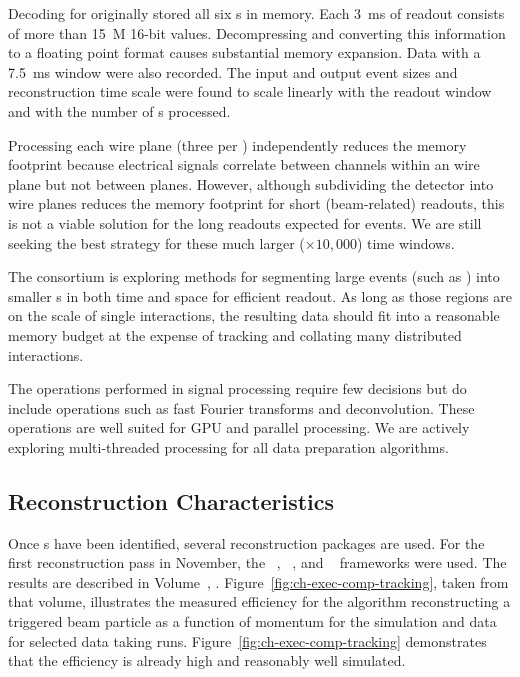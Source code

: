 Decoding for  originally stored all six s in memory. Each \SI{3}{ms} of  readout consists of more than \SI{15}{M} 16-bit values. Decompressing and converting this information to a floating point format causes substantial memory expansion. 
  Data with a \SI{7.5}{ms} window were also recorded. 
The input and output event sizes and reconstruction time scale were found to scale linearly with the readout window and with the number of s processed. 

Processing each wire plane (three per ) independently reduces the memory footprint because electrical signals correlate between channels within an  wire plane but not between planes.
However,  although subdividing the detector into wire planes reduces the memory footprint for short (beam-related) readouts, this is  not a viable solution for the long readouts expected for  events. We are still seeking the best strategy for these much larger ($\times 10,000$) time windows. 

The  consortium is exploring methods for segmenting large events (such as ) into  smaller s in both time and space for efficient readout.  As long as those regions are on the scale of single interactions, the resulting data should fit into a reasonable memory budget at the expense of tracking and collating many distributed interactions. 

The operations performed in signal processing require few decisions but do include operations such as fast Fourier transforms and deconvolution.  These operations are well suited for GPU and parallel processing. We are actively exploring multi-threaded processing for all data preparation algorithms. 


\subsection{Reconstruction Characteristics}

Once s have been identified, several \threed  reconstruction packages are used. For the first reconstruction pass in November, the  ~\cite{Acciarri:2017hat}, ~\cite{wirecell}, and ~\cite{ref:PMA}  frameworks were used. The results are described in Volume~\volnumberphysics{}, \voltitlephysics{}. 
Figure~\ref{fig:ch-exec-comp-tracking}, taken from that volume, illustrates the measured efficiency for the  algorithm reconstructing a triggered beam particle as a function of momentum for the simulation and data for selected data taking runs. Figure~\ref{fig:ch-exec-comp-tracking} demonstrates that the efficiency is already high and reasonably well simulated.

